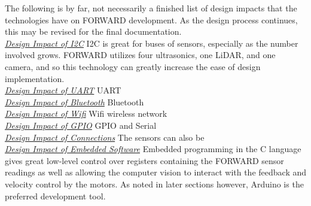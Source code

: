 \newline \noindent The following is by far, not necessarily a finished list of design impacts that the technologies have on FORWARD development. As the design process continues, this may be revised for the final documentation.\\

\noindent \underline{\textit{Design Impact of I2C}}
I2C is great for buses of sensors, especially as the number involved grows. FORWARD utilizes four ultrasonics, one LiDAR, and one camera, and so this technology can greatly increase the ease of design implementation.\\

\noindent \underline{\textit{Design Impact of UART}}
UART\\
	
\noindent \underline{\textit{Design Impact of Bluetooth}}
Bluetooth\\

\noindent \underline{\textit{Design Impact of Wifi}}
Wifi wireless network\\

\noindent \underline{\textit{Design Impact of GPIO}}
GPIO and Serial\\

\noindent \underline{\textit{Design Impact of Connections}}
The sensors can also be\\

\noindent \underline{\textit{Design Impact of Embedded Software}}
Embedded programming in the C language gives great low-level control over registers containing the FORWARD sensor readings as well as allowing the computer vision to interact with the feedback and velocity control by the motors. As noted in later sections however, Arduino is the preferred development tool.\\

